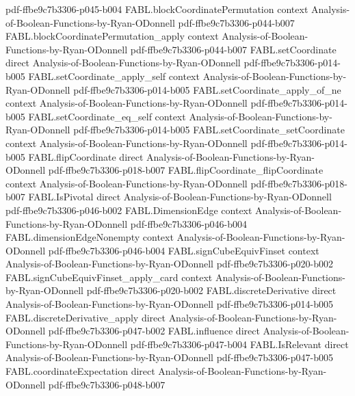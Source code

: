 \begin{theorem}
  {pdf-ffbe9c7b3306-p045-b004}
\proofstep
  {FABL.blockCoordinatePermutation}
  {context}
  {Analysis-of-Boolean-Functions-by-Ryan-ODonnell}
  {pdf-ffbe9c7b3306-p044-b007}
\proofstep
  {FABL.blockCoordinatePermutation_apply}
  {context}
  {Analysis-of-Boolean-Functions-by-Ryan-ODonnell}
  {pdf-ffbe9c7b3306-p044-b007}
\proofstep
  {FABL.setCoordinate}
  {direct}
  {Analysis-of-Boolean-Functions-by-Ryan-ODonnell}
  {pdf-ffbe9c7b3306-p014-b005}
\proofstep
  {FABL.setCoordinate_apply_self}
  {context}
  {Analysis-of-Boolean-Functions-by-Ryan-ODonnell}
  {pdf-ffbe9c7b3306-p014-b005}
\proofstep
  {FABL.setCoordinate_apply_of_ne}
  {context}
  {Analysis-of-Boolean-Functions-by-Ryan-ODonnell}
  {pdf-ffbe9c7b3306-p014-b005}
\proofstep
  {FABL.setCoordinate_eq_self}
  {context}
  {Analysis-of-Boolean-Functions-by-Ryan-ODonnell}
  {pdf-ffbe9c7b3306-p014-b005}
\proofstep
  {FABL.setCoordinate_setCoordinate}
  {context}
  {Analysis-of-Boolean-Functions-by-Ryan-ODonnell}
  {pdf-ffbe9c7b3306-p014-b005}
\proofstep
  {FABL.flipCoordinate}
  {direct}
  {Analysis-of-Boolean-Functions-by-Ryan-ODonnell}
  {pdf-ffbe9c7b3306-p018-b007}
\proofstep
  {FABL.flipCoordinate_flipCoordinate}
  {context}
  {Analysis-of-Boolean-Functions-by-Ryan-ODonnell}
  {pdf-ffbe9c7b3306-p018-b007}
\proofstep
  {FABL.IsPivotal}
  {direct}
  {Analysis-of-Boolean-Functions-by-Ryan-ODonnell}
  {pdf-ffbe9c7b3306-p046-b002}
\proofstep
  {FABL.DimensionEdge}
  {context}
  {Analysis-of-Boolean-Functions-by-Ryan-ODonnell}
  {pdf-ffbe9c7b3306-p046-b004}
\proofstep
  {FABL.dimensionEdgeNonempty}
  {context}
  {Analysis-of-Boolean-Functions-by-Ryan-ODonnell}
  {pdf-ffbe9c7b3306-p046-b004}
\proofstep
  {FABL.signCubeEquivFinset}
  {context}
  {Analysis-of-Boolean-Functions-by-Ryan-ODonnell}
  {pdf-ffbe9c7b3306-p020-b002}
\proofstep
  {FABL.signCubeEquivFinset_apply_card}
  {context}
  {Analysis-of-Boolean-Functions-by-Ryan-ODonnell}
  {pdf-ffbe9c7b3306-p020-b002}
\proofstep
  {FABL.discreteDerivative}
  {direct}
  {Analysis-of-Boolean-Functions-by-Ryan-ODonnell}
  {pdf-ffbe9c7b3306-p014-b005}
\proofstep
  {FABL.discreteDerivative_apply}
  {direct}
  {Analysis-of-Boolean-Functions-by-Ryan-ODonnell}
  {pdf-ffbe9c7b3306-p047-b002}
\proofstep
  {FABL.influence}
  {direct}
  {Analysis-of-Boolean-Functions-by-Ryan-ODonnell}
  {pdf-ffbe9c7b3306-p047-b004}
\proofstep
  {FABL.IsRelevant}
  {direct}
  {Analysis-of-Boolean-Functions-by-Ryan-ODonnell}
  {pdf-ffbe9c7b3306-p047-b005}
\proofstep
  {FABL.coordinateExpectation}
  {direct}
  {Analysis-of-Boolean-Functions-by-Ryan-ODonnell}
  {pdf-ffbe9c7b3306-p048-b007}
\proofstep

\end{theorem}
